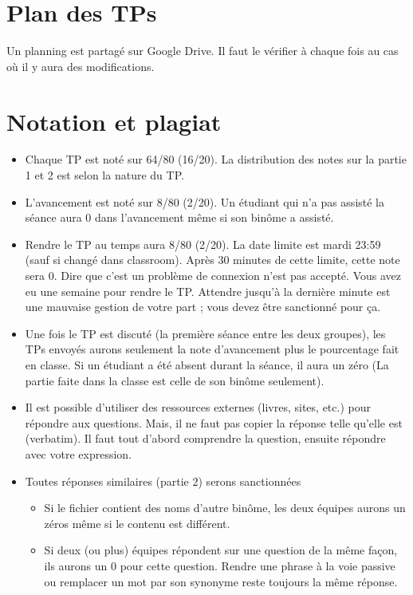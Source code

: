 \documentclass[11pt, a4paper]{article}
\begin{document}
\section{Plan des TPs}

Un planning est partagé sur Google Drive. 
Il faut le vérifier à chaque fois au cas où il y aura des modifications.


\section{Notation et plagiat}

\begin{itemize}
	\item Chaque TP est noté sur 64/80 (16/20). La distribution des notes sur la partie 1 et 2 est selon la nature du TP.
	\item L'avancement est noté sur 8/80 (2/20). 
	Un étudiant qui n'a pas assisté la séance aura 0 dans l'avancement même si son binôme a assisté.
	\item Rendre le TP au temps aura 8/80 (2/20). 
	La date limite est mardi 23:59 (sauf si changé dans classroom).
	Après 30 minutes de cette limite, cette note sera 0.
	Dire que c'est un problème de connexion n'est pas accepté. 
	Vous avez eu une semaine pour rendre le TP.
	Attendre jusqu'à la dernière minute est une mauvaise gestion de votre part ; vous devez être sanctionné pour ça. 
	\item Une fois le TP est discuté (la première séance entre les deux groupes), les TPs envoyés aurons seulement la note d'avancement plus le pourcentage fait en classe.
	Si un étudiant a été absent durant la séance, il aura un zéro (La partie faite dans la classe est celle de son binôme seulement).
	\item Il est possible d'utiliser des ressources externes (livres, sites, etc.) pour répondre aux questions. 
	Mais, il ne faut pas copier la réponse telle qu'elle est (verbatim).
	Il faut tout d'abord comprendre la question, ensuite répondre avec votre expression. 
	\item Toutes réponses similaires (partie 2) serons sanctionnées
	\begin{itemize}
		\item Si le fichier contient des noms d'autre binôme, les deux équipes aurons un zéros même si le contenu est différent.
		\item Si deux (ou plus) équipes répondent sur une question de la même façon, ils aurons un 0 pour cette question.
		Rendre une phrase à la voie passive ou remplacer un mot par son synonyme reste toujours la même réponse.

\end{itemize}
\end{itemize}
\end{document}
